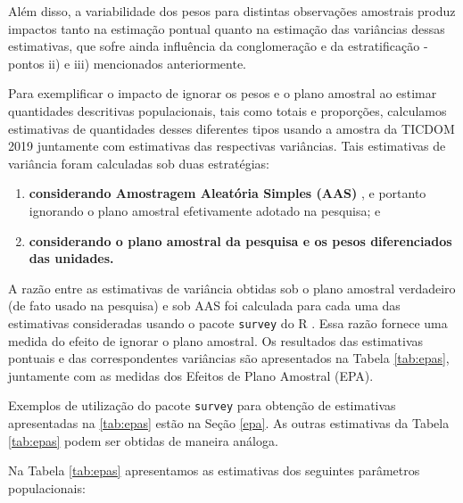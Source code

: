 \documentclass[
]{book}
\begin{document}
Além disso, a variabilidade dos pesos para distintas observações amostrais
produz impactos tanto na estimação pontual quanto na estimação das variâncias dessas estimativas, que sofre ainda influência da conglomeração e da estratificação - pontos ii) e iii) mencionados anteriormente.

Para exemplificar o impacto de ignorar os pesos e o plano amostral ao estimar quantidades descritivas populacionais, tais como totais e proporções, calculamos estimativas de quantidades desses diferentes tipos usando a amostra da TICDOM 2019 juntamente com estimativas das respectivas variâncias. Tais estimativas de variância foram calculadas sob duas estratégias:

\begin{enumerate}
\def\labelenumi{\alph{enumi})}
\item
  \textbf{considerando Amostragem Aleatória Simples (AAS)} , e portanto ignorando
  o plano amostral efetivamente adotado na pesquisa; e
\item
  \textbf{considerando o plano amostral da pesquisa e os pesos diferenciados das unidades.}
\end{enumerate}

A razão entre as estimativas de variância obtidas sob o plano amostral verdadeiro (de fato usado na pesquisa) e sob AAS foi calculada para cada uma
das estimativas consideradas usando o pacote \texttt{survey} do R \citep{R-survey}. Essa razão fornece uma medida do efeito de ignorar o plano amostral. Os resultados das estimativas pontuais e das correspondentes variâncias são apresentados na Tabela \ref{tab:epas}, juntamente com as medidas dos Efeitos de Plano Amostral (EPA).

Exemplos de utilização do pacote \texttt{survey} para obtenção de estimativas
apresentadas na \ref{tab:epas} estão na Seção \ref{epa}. As outras
estimativas da Tabela \ref{tab:epas} podem ser obtidas de maneira análoga.

Na Tabela \ref{tab:epas} apresentamos as estimativas dos seguintes parâmetros populacionais:
\end{document}
